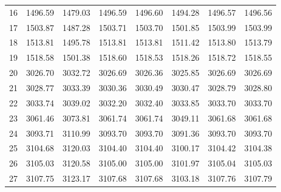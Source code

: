 \documentclass[10pt,oneside]{article}
\begin{document}
\begin{table}[h!]
\begin{tabular}{cccccccc}
16 &   1496.59 & 1479.03 & 1496.59 & 1496.60 &      1494.28 & 1496.57 & 1496.56 \\
17 &   1503.87 & 1487.28 & 1503.71 & 1503.70 &      1501.85 & 1503.99 & 1503.99 \\
18 &   1513.81 & 1495.78 & 1513.81 & 1513.81 &      1511.42 & 1513.80 & 1513.79 \\
19 &   1518.58 & 1501.38 & 1518.60 & 1518.53 &      1518.26 & 1518.72 & 1518.55 \\
20 &   3026.70 & 3032.72 & 3026.69 & 3026.36 &      3025.85 & 3026.69 & 3026.69 \\
21 &   3028.77 & 3033.39 & 3030.36 & 3030.49 &      3030.47 & 3028.79 & 3028.80 \\
22 &   3033.74 & 3039.02 & 3032.20 & 3032.40 &      3033.85 & 3033.70 & 3033.70 \\
23 &   3061.46 & 3073.81 & 3061.74 & 3061.74 &      3049.11 & 3061.68 & 3061.68 \\
24 &   3093.71 & 3110.99 & 3093.70 & 3093.70 &      3091.36 & 3093.70 & 3093.70 \\
25 &   3104.68 & 3120.03 & 3104.40 & 3104.40 &      3100.17 & 3104.42 & 3104.38 \\
26 &   3105.03 & 3120.58 & 3105.00 & 3105.00 &      3101.97 & 3105.04 & 3105.03 \\
27 &   3107.75 & 3123.17 & 3107.68 & 3107.68 &      3103.18 & 3107.76 & 3107.79 \\
\bottomrule
\end{tabular}
\end{table}

\clearpage
\end{document}
